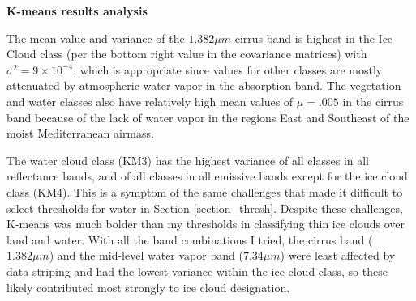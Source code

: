 \documentclass[12pt]{article}
\begin{document}
\noindent
\textbf{K-means results analysis}

The mean value and variance of the $1.382\mu m$ cirrus band is highest in the Ice Cloud class (per the bottom right value in the covariance matrices) with $\sigma^2=9\times10^{-4}$, which is appropriate since values for other classes are mostly attenuated by atmospheric water vapor in the absorption band. The vegetation and water classes also have relatively high mean values of $\mu = .005$ in the cirrus band because of the lack of water vapor in the regions East and Southeast of the moist Mediterranean airmass.

The water cloud class (KM3) has the highest variance of all classes in all reflectance bands, and of all classes in all emissive bands except for the ice cloud class (KM4). This is a symptom of the same challenges that made it difficult to select thresholds for water in Section \ref{section_thresh}. Despite these challenges, K-means was much bolder than my thresholds in classifying thin ice clouds over land and water. With all the band combinations I tried, the cirrus band ($1.382\mu m$) and the mid-level water vapor band ($7.34\mu m$) were least affected by data striping and had the lowest variance within the ice cloud class, so these likely contributed most strongly to ice cloud designation.

\clearpage
\end{document}
